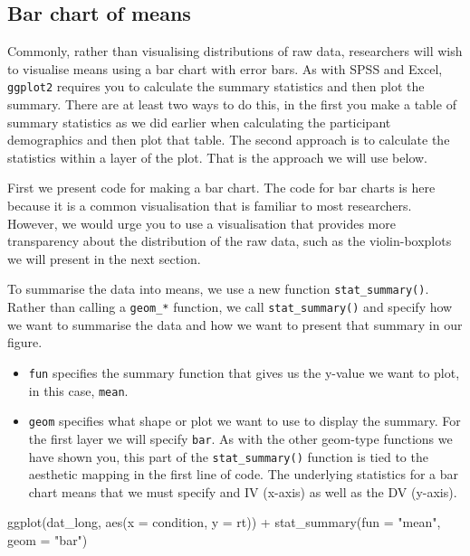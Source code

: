 \documentclass[
  english,
  doc,floatsintext]{apa6}
\newenvironment{Shaded}{\begin{snugshade}}{\end{snugshade}}
\newcommand{\AttributeTok}[1]{\textcolor[rgb]{0.77,0.63,0.00}{#1}}
\newcommand{\FunctionTok}[1]{\textcolor[rgb]{0.00,0.00,0.00}{#1}}
\newcommand{\NormalTok}[1]{#1}
\newcommand{\SpecialCharTok}[1]{\textcolor[rgb]{0.00,0.00,0.00}{#1}}
\newcommand{\StringTok}[1]{\textcolor[rgb]{0.31,0.60,0.02}{#1}}
\begin{document}
\hypertarget{bar-chart-of-means}{%
\subsection{Bar chart of means}\label{bar-chart-of-means}}

Commonly, rather than visualising distributions of raw data, researchers will wish to visualise means using a bar chart with error bars. As with SPSS and Excel, \texttt{ggplot2} requires you to calculate the summary statistics and then plot the summary. There are at least two ways to do this, in the first you make a table of summary statistics as we did earlier when calculating the participant demographics and then plot that table. The second approach is to calculate the statistics within a layer of the plot. That is the approach we will use below.

First we present code for making a bar chart. The code for bar charts is here because it is a common visualisation that is familiar to most researchers. However, we would urge you to use a visualisation that provides more transparency about the distribution of the raw data, such as the violin-boxplots we will present in the next section.

To summarise the data into means, we use a new function \texttt{stat\_summary()}. Rather than calling a \texttt{geom\_*} function, we call \texttt{stat\_summary()} and specify how we want to summarise the data and how we want to present that summary in our figure.

\begin{itemize}
\item
  \texttt{fun} specifies the summary function that gives us the y-value we want to plot, in this case, \texttt{mean}.
\item
  \texttt{geom} specifies what shape or plot we want to use to display the summary. For the first layer we will specify \texttt{bar}. As with the other geom-type functions we have shown you, this part of the \texttt{stat\_summary()} function is tied to the aesthetic mapping in the first line of code. The underlying statistics for a bar chart means that we must specify and IV (x-axis) as well as the DV (y-axis).
\end{itemize}

\begin{Shaded}
\begin{Highlighting}[]
\FunctionTok{ggplot}\NormalTok{(dat\_long, }\FunctionTok{aes}\NormalTok{(}\AttributeTok{x =}\NormalTok{ condition, }\AttributeTok{y =}\NormalTok{ rt)) }\SpecialCharTok{+}
  \FunctionTok{stat\_summary}\NormalTok{(}\AttributeTok{fun =} \StringTok{"mean"}\NormalTok{, }\AttributeTok{geom =} \StringTok{"bar"}\NormalTok{)}
\end{Highlighting}
\end{Shaded}
\end{document}

